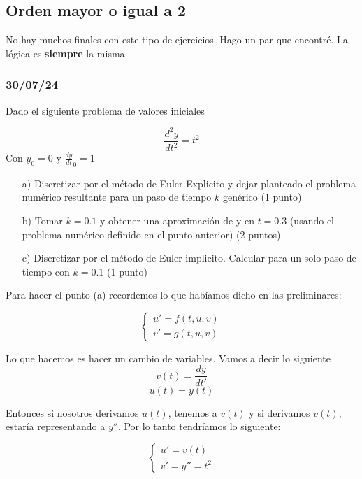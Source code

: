 \subsection{Orden mayor o igual a 2}

No hay muchos finales con este tipo de ejercicios. Hago un par que encontré. La lógica es \textbf{siempre} la misma.

\subsubsection{30/07/24}
Dado el siguiente problema de valores iniciales

$$
    \frac{d^2y}{dt^2} = t^2
$$
Con $y_0 = 0$ y $\frac{dy}{dt}_0 = 1$

\begin{enumerate}
    \item[a)] Discretizar por el método de Euler Explicito y dejar planteado el problema numérico resultante para un paso de tiempo $k$ genérico (1 punto)
    \item[b)] Tomar $k = 0.1$ y obtener una aproximación de y en $t=0.3$ (usando el problema numérico definido en el punto anterior) (2 puntos)
    \item[c)] Discretizar por el método de Euler implicito. Calcular para un solo paso de tiempo con $k=0.1$ (1 punto)
\end{enumerate}


Para hacer el punto (a) recordemos lo que habíamos dicho en las preliminares: 

\begin{equation}
\left\{
\begin{array}{l}
u' = f(t,u,v) \\
v' = g(t,u,v)
\end{array}
\right.
\end{equation}


Lo que hacemos es hacer un cambio de variables. Vamos a decir lo siguiente 
$$v(t) = \frac{dy}{dt'}$$
$$u(t) = y(t)$$

Entonces si nosotros derivamos $u(t)$, tenemos a $v(t)$ y si derivamos $v(t)$, estaría representando a $y''$. Por lo tanto tendríamos lo siguiente:

\begin{equation}
\left\{
\begin{array}{l}
u' = v(t) \\
v' = y'' = t^2
\end{array}
\right.
\end{equation}

